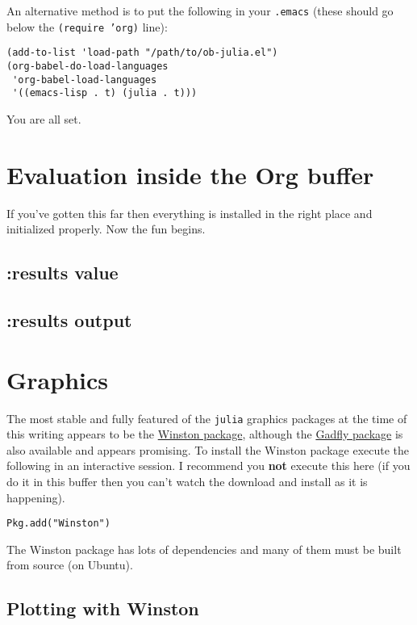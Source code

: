 \documentclass[11pt]{article}
\begin{document}
An alternative method is to put the following in your \texttt{.emacs} (these
should go below the \texttt{(require 'org)} line):

\begin{verbatim}
(add-to-list 'load-path "/path/to/ob-julia.el")
(org-babel-do-load-languages
 'org-babel-load-languages
 '((emacs-lisp . t) (julia . t)))
\end{verbatim}

You are all set.
\section[Evaluation inside the Org buffer]{Evaluation inside the Org buffer}
\label{sec-2}

If you've gotten this far then everything is installed in the right
place and initialized properly. Now the fun begins.

\subsection[:results value]{:results value}
\label{sec-2-1}

\subsection[:results output]{:results output}
\label{sec-2-2}
\section[Graphics]{Graphics}
\label{sec-3}

The most stable and fully featured of the \texttt{julia} graphics packages at
the time of this writing appears to be the \href{https://github.com/nolta/Winston.jl}{Winston package}, although
the \href{https://github.com/dcjones/Gadfly.jl}{Gadfly package} is also available and appears promising.  To
install the Winston package execute the following in an interactive
session.  I recommend you \textbf{not} execute this here (if you do it in
this buffer then you can't watch the download and install as it is
happening).

\begin{verbatim}
Pkg.add("Winston")
\end{verbatim}

The Winston package has lots of dependencies and many of them must be
built from source (on Ubuntu).

\subsection[Plotting with Winston]{Plotting with Winston}
\label{sec-3-1}
\end{document}
